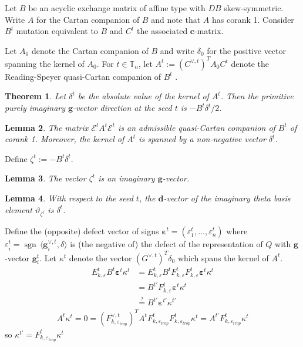 \documentclass{amsart}
\newtheorem{theorem}{Theorem}
\newtheorem{lemma}[theorem]{Lemma}
\numberwithin{theorem}{section}
\newcommand{\bfc}{\boldsymbol{c}}
\newcommand{\bfd}{\boldsymbol{d}}
\newcommand{\bfg}{\boldsymbol{g}}
\newcommand{\cE}{\mathcal{E}}
\newcommand{\TT}{\mathbb{T}}
\newcommand{\sgn}{{\operatorname{sgn}}}
\begin{document}
  Let $B$ be an acyclic exchange matrix of affine type with $DB$ skew-symmetric.
  Write $A$ for the Cartan companion of $B$ and note that $A$ has corank 1.
  Consider $B^t$ mutation equivalent to $B$ and $C^t$ the associated $\bfc$-matrix.

  Let $A_0$ denote the Cartan companion of $B$ and write $\delta_0$ for the positive vector spanning the kernel of $A_0$.
  For $t\in\TT_n$, let $A^t:=(C^{\vee,t})^T A_0 C^t$ denote the Reading-Speyer quasi-Cartan companion of $B^t$ \cite[Cor. 3.29]{Combinatorial Frameworks for Cluster Algebras}.
  \begin{theorem}
    Let $\delta^t$ be the absolute value of the kernel of $A^t$.
    Then the primitive purely imaginary $\bfg$-vector direction at the seed $t$ is $-B^t\delta^t/2$.
  \end{theorem}

  \begin{lemma}
    The matrix $\cE^t A^t \cE^t$ is an admissible quasi-Cartan companion of $B^t$ of corank 1.
    Moreover, the kernel of $A^t$ is spanned by a non-negative vector $\delta^t$. 
  \end{lemma}

  Define $\zeta^t := -B^t \delta^t$.
  \begin{lemma}
    The vector $\zeta^t$ is an imaginary $\bfg$-vector.
  \end{lemma}

  \begin{lemma}
    With respect to the seed $t$, the $\bfd$-vector of the imaginary theta basis element $\vartheta_{\zeta^t}$ is $\delta^t$. 
  \end{lemma}

  Define the (opposite) defect vector of signs $\boldsymbol{\varepsilon}^t=(\varepsilon^t_1,\ldots,\varepsilon^t_n)$ where $\varepsilon^t_i=\sgn\,\langle \bfg^{\vee,t}_i,\delta\rangle$ is (the negative of) the defect of the representation of $Q$ with $\bfg$-vector $\bfg^t_i$.
  Let $\kappa^t$ denote the vector $(G^{\vee,t})^T\delta_0$ which spans the kernel of $A^t$.
  \begin{align*}
    E_{k,\varepsilon}^t B^t \boldsymbol{\varepsilon}^t \kappa^t
    &=
    E_{k,\varepsilon}^t B^t F^t_{k,\varepsilon} F^t_{k,\varepsilon} \boldsymbol{\varepsilon}^t \kappa^t\\
    &=
    B^{t'} F^t_{k,\varepsilon} \boldsymbol{\varepsilon}^t \kappa^t\\
    &\stackrel{?}{=} B^{t'} \boldsymbol{\varepsilon}^{t'} \kappa^{t'}
  \end{align*}
  \begin{align*}
    A^t\kappa^t=0=(F^{\vee,t}_{k,\varepsilon_{trop}})^T A^t F^t_{k,\varepsilon_{trop}} F^t_{k,\varepsilon_{trop}} \kappa^t=A^{t'} F^t_{k,\varepsilon_{trop}} \kappa^t
  \end{align*}
  so $\kappa^{t'}=F^t_{k,\varepsilon_{trop}} \kappa^t$
\end{document}
